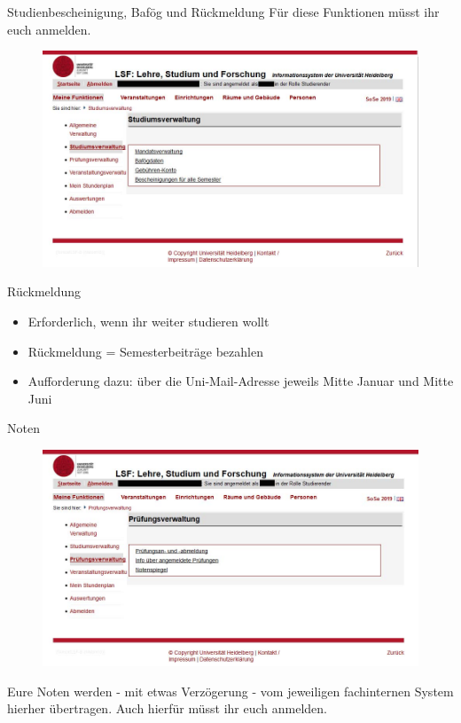 \begin{frame}{Studienbescheinigung, Bafög und Rückmeldung}
Für diese Funktionen müsst ihr euch anmelden.
  \begin{figure}
     \centering
     \includegraphics[scale=0.3]{images/lsf12.jpg}
  \end{figure}
\end{frame}

\begin{frame}{Rückmeldung}
  \begin{itemize}
    \item{Erforderlich, wenn ihr weiter studieren wollt}
    \item{Rückmeldung = Semesterbeiträge bezahlen}
    \item{Aufforderung dazu: über die Uni-Mail-Adresse jeweils Mitte Januar und Mitte Juni}
\end{itemize}
\end{frame}

\begin{frame}{Noten}
  \begin{figure}
     \centering
     \includegraphics[scale=0.3]{images/lsf13.jpg}
  \end{figure}
Eure Noten werden - mit etwas Verzögerung - vom jeweiligen fachinternen System hierher übertragen. Auch hierfür müsst ihr euch anmelden.
\end{frame}

